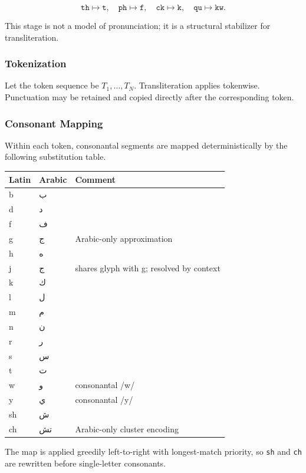 \documentclass[12pt]{article}
\newcommand{\AR}[1]{\foreignlanguage{arabic}{#1}}
\begin{document}
\[
\texttt{th} \mapsto \texttt{t},\quad
\texttt{ph} \mapsto \texttt{f},\quad
\texttt{ck} \mapsto \texttt{k},\quad
\texttt{qu} \mapsto \texttt{kw}.
\]

This stage is not a model of pronunciation; it is a structural stabilizer for transliteration.

\subsubsection{Tokenization}

Let the token sequence be $T_1,\dots,T_N$. Transliteration applies tokenwise. Punctuation may be retained and copied directly after the corresponding token.

\subsubsection{Consonant Mapping}

Within each token, consonantal segments are mapped deterministically by the following substitution table.

\begin{center}
\begin{tabular}{lll}
Latin & Arabic & Comment \\
\hline
b & \AR{ب} & \\
d & \AR{د} & \\
f & \AR{ف} & \\
g & \AR{ج} & Arabic-only approximation \\
h & \AR{ه} & \\
j & \AR{ج} & shares glyph with g; resolved by context \\
k & \AR{ك} & \\
l & \AR{ل} & \\
m & \AR{م} & \\
n & \AR{ن} & \\
r & \AR{ر} & \\
s & \AR{س} & \\
t & \AR{ت} & \\
w & \AR{و} & consonantal /w/ \\
y & \AR{ي} & consonantal /y/ \\
sh & \AR{ش} & \\
ch & \AR{تش} & Arabic-only cluster encoding \\
\end{tabular}
\end{center}

The map is applied greedily left-to-right with longest-match priority, so \texttt{sh} and \texttt{ch} are rewritten before single-letter consonants.
\end{document}
